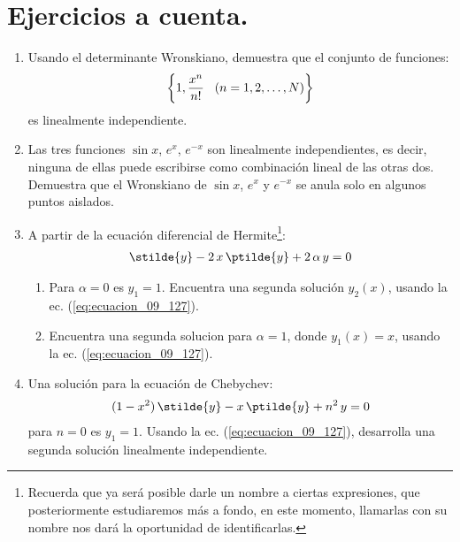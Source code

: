 \section{Ejercicios a cuenta.}

\begin{enumerate}
\item Usando el determinante Wronskiano, demuestra que el conjunto de funciones:
\begin{align*}
\left\{ 1, \dfrac{x^{n}}{n!} \hspace{0.3cm} (n = 1, 2, \ldots, N) \right\}    
\end{align*}
es linealmente independiente.
\item Las tres funciones $\sin x$, $e^{x}$, $e^{-x}$ son linealmente independientes, es decir, ninguna de ellas puede escribirse como combinación lineal de las otras dos. Demuestra que el Wronskiano de $\sin x$, $e^{x}$ y $e^{-x}$ se anula solo en algunos puntos aislados.
\item A partir de la ecuación diferencial de Hermite\footnote{Recuerda que ya será posible darle un nombre a ciertas expresiones, que posteriormente estudiaremos más a fondo, en este momento, llamarlas con su nombre nos dará la oportunidad de identificarlas.}:
\begin{align*}
\stilde{y} - 2 \, x \, \ptilde{y} +  2 \, \alpha \, y = 0
\end{align*}
\begin{enumerate}
\item Para $\alpha = 0$ es $y_{1} = 1$. Encuentra una segunda solución $y_{2}(x)$, usando la ec. (\ref{eq:ecuacion_09_127}).
\item Encuentra una segunda solucion para $\alpha = 1$, donde $y_{1}(x) = x$, usando la ec. (\ref{eq:ecuacion_09_127}).
\end{enumerate}
\item Una solución para la ecuación de Chebychev:
\begin{align*}
(1 - x^{2}) \, \stilde{y} -  x \, \ptilde{y} + n^{2} \, y = 0
\end{align*}
para $n = 0$ es $y_{1} = 1$.
Usando la ec. (\ref{eq:ecuacion_09_127}), desarrolla una segunda solución linealmente independiente.
\end{enumerate}


